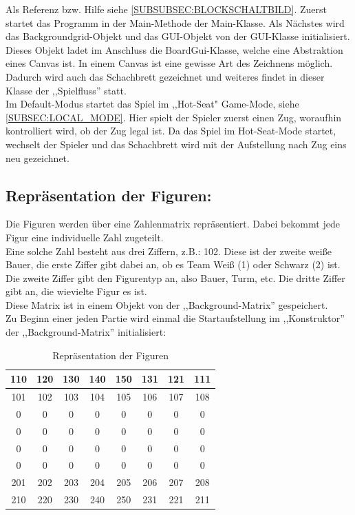 \documentclass[12pt,a4paper]{article}
\newcommand{\cmnt}[1]{}			%
\begin{document}
\cmnt{Hier soll erklärt werden wie JavaChess initialisiert wird.}

Als Referenz bzw. Hilfe siehe \ref{SUBSUBSEC:BLOCKSCHALTBILD}.
Zuerst startet das Programm in der Main-Methode der Main-Klasse. Als Nächstes wird das Backgroundgrid-Objekt und das GUI-Objekt von der GUI-Klasse initialisiert. \\
Dieses Objekt ladet im Anschluss die BoardGui-Klasse, welche eine Abstraktion eines Canvas ist. In einem Canvas ist eine gewisse Art des Zeichnens möglich. Dadurch wird auch das Schachbrett gezeichnet und weiteres findet in dieser Klasse der ,,Spielfluss'' statt. \\ 
Im Default-Modus startet das Spiel im ,,Hot-Seat" Game-Mode, siehe \ref{SUBSEC:LOCAL_MODE}. Hier spielt der Spieler zuerst einen Zug, woraufhin kontrolliert wird, ob der Zug legal ist. Da das Spiel im Hot-Seat-Mode startet, wechselt der Spieler und das Schachbrett wird mit der Aufstellung nach Zug eins neu gezeichnet.

\subsection{Repräsentation der Figuren:}

Die Figuren werden über eine Zahlenmatrix repräsentiert. Dabei bekommt jede Figur eine individuelle Zahl zugeteilt. \\
Eine solche Zahl besteht aus drei Ziffern, z.B.: 102. Diese ist der zweite weiße Bauer, die erste Ziffer gibt dabei an, ob es Team Weiß (1) oder Schwarz (2) ist. Die zweite Ziffer gibt den Figurentyp an, also Bauer, Turm, etc. Die dritte Ziffer gibt an, die wievielte Figur es ist. \\
Diese Matrix ist in einem Objekt von der ,,Background-Matrix'' gespeichert. \\
Zu Beginn einer jeden Partie wird einmal die Startaufstellung im ,,Konstruktor'' der ,,Background-Matrix'' initialisiert:

	\begin{table}[H]
		\centering
		\begin{tabular}{| c | c | c | c | c | c | c | c |}
			\hline
			110 & 120 	& 	130 & 140 	& 150 	& 131 	& 121 	& 	111 \\ \hline
			101 & 102 	& 	103 & 	104 & 	105 & 	106 & 	107 & 	108 \\ \hline
			0	&	0	& 	0	&	0	&	0	&	0	&	0	&	0	\\ \hline
			0	&	0	& 	0	&	0	&	0	&	0	&	0	&	0 	\\ \hline
			0	&	0	& 	0	&	0	&	0	&	0	&	0	&	0 	\\ \hline
			0	&	0	& 	0	&	0	&	0	&	0	&	0	&	0 	\\ \hline
			201 &	202 &	203	&	204	&	205	&	206	&	207	&	208	\\ \hline
			210 & 	220	&	230	&	240	&	250	&	231	&	221	&	211 \\ 
			\hline	
		\end{tabular}
		\caption{Repräsentation der Figuren}
		\label{TABLE:REPRESENTATION-MEEPLES}
	\end{table}
\end{document}
